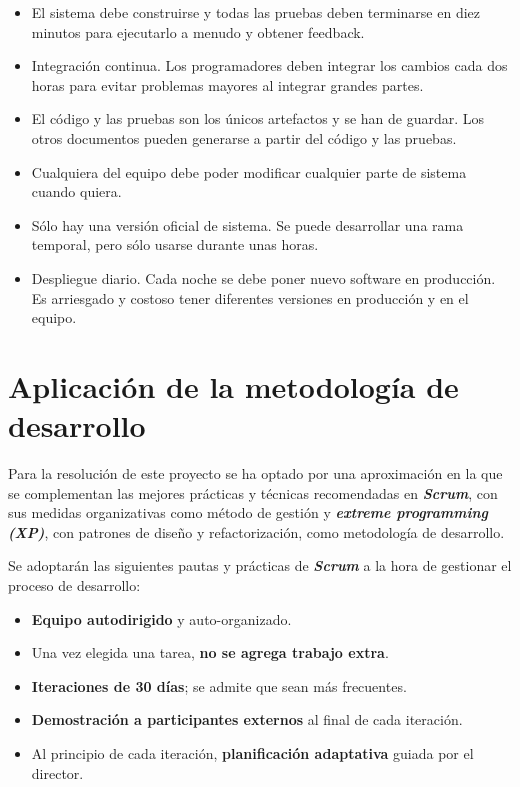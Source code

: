 \begin{itemize}
\item El sistema debe construirse y todas las pruebas deben terminarse en diez minutos para ejecutarlo a menudo y obtener feedback. 
\item Integración continua. Los programadores deben integrar los cambios cada dos horas para evitar problemas mayores al integrar grandes partes.
\item El código y las pruebas son los únicos artefactos y se han de guardar. Los otros documentos pueden generarse a partir del código y las pruebas.
\item Cualquiera del equipo debe poder modificar cualquier parte de sistema cuando quiera. 
\item Sólo hay una versión oficial de sistema. Se puede desarrollar una rama temporal, pero sólo usarse durante unas horas.
\item Despliegue diario. Cada noche se debe poner nuevo software en producción. Es arriesgado y costoso tener diferentes versiones en producción y en el equipo.
\end{itemize}


\section{Aplicación de la metodología de desarrollo}

Para la resolución de este proyecto se ha optado por una aproximación en la que se complementan las mejores prácticas y técnicas recomendadas en \textbf{\textit{Scrum}}, con sus medidas organizativas como método de gestión y \textbf{\textit{extreme programming (XP)}}, con patrones de diseño y refactorización, como metodología de desarrollo.

Se adoptarán las siguientes pautas y prácticas de \textbf{\textit{Scrum}} a la hora de gestionar el proceso de desarrollo:
\begin{itemize}
\item \textbf{Equipo autodirigido} y auto-organizado. 
\item Una vez elegida una tarea, \textbf{no se agrega trabajo extra}. %
\item \textbf{Iteraciones de 30 días}; se admite que sean más frecuentes.
\item \textbf{Demostración a participantes externos} al final de cada iteración. 
\item Al principio de cada iteración, \textbf{planificación adaptativa} guiada por el director.
\end{itemize}

